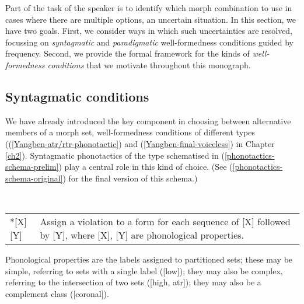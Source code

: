 Part of the task of the speaker is to identify which morph combination to use in cases where there are multiple options, an uncertain situation. In this section, we have two goals. First, we consider ways in which such uncertainties are resolved, focussing on  \textit{syntagmatic} and \textit{paradigmatic} well-formedness conditions guided by frequency. Second, we provide the formal framework for the kinds of \textit{well-formedness conditions} that we motivate throughout this monograph. 


\subsection{Syntagmatic conditions} \label{phonotactic-selection-section-revised}
We have already introduced the key component in choosing between alternative members of a morph set, well-formedness conditions of different types ((\ref{Yangben-atr/rtr-phonotactic}) and (\ref{Yangben-final-voiceless}) in Chapter \ref{ch2}). Syntagmatic phonotactics of the type schematised in (\ref{phonotactics-schema-prelim})  play a central role in this kind of choice.  (See (\ref{phonotactics-schema-original}) for the final version of this schema.)

\begin{example}  \label{phonotactics-schema-prelim}\smallskip\\
    \begin{tabularx}{\linewidth}{@{}lQ@{}}
        *[X][Y] & Assign a violation to a form for each  sequence of [X] followed by [Y], where [X], [Y] are phonological properties.
    \end{tabularx}
\end{example}

Phonological properties are the labels assigned to partitioned sets; these may be simple, referring to sets with a single label ([low]); they may also be complex, referring to the intersection of two sets ([high, atr]); they may also be a complement class (\up{$\wedge$}[coronal]).

